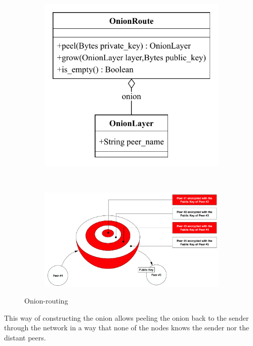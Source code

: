 \documentclass{article}
\begin{document}
\begin{figure}[t!]
    \centering 
    \begin{subfigure}[t]{0.3\textwidth}
		\centering
		\includegraphics[scale=0.7]{OnionRoute.pdf}
	\end{subfigure}%
    ~ 
    \begin{subfigure}[t]{0.7\textwidth}
		\centering
		\includegraphics[scale=0.35]{onion.pdf}
	\end{subfigure}
    \caption{Onion-routing}
	\label{fig:fr:onionrouting}
\end{figure}


This way of constructing the onion allows peeling the onion back to the sender through the network in a way that none of the nodes knows the sender nor the distant peers.
\end{document}

